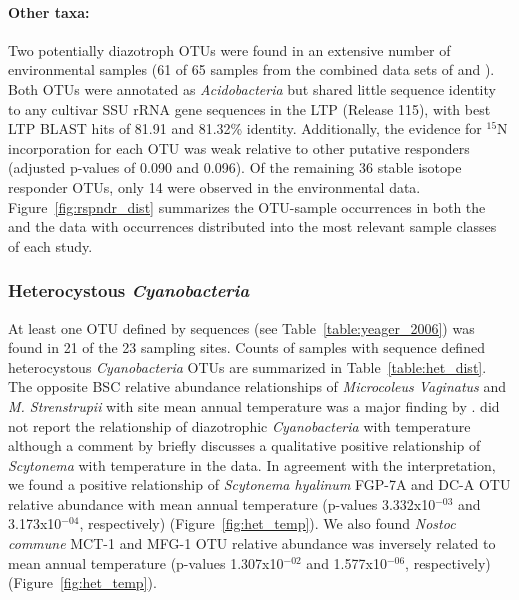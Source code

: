 \paragraph{\textbf{Other taxa:}} Two potentially diazotroph OTUs were found
in an extensive number of environmental samples (61 of 65 samples from the
combined data sets of \citet{Garcia_Pichel_2013} and \citet{Steven_2013}).
Both OTUs were annotated as \textit{Acidobacteria} but shared little sequence
identity to any cultivar SSU rRNA gene sequences in the LTP (Release 115),
with best LTP BLAST hits of 81.91 and 81.32\% identity. Additionally, the
evidence for $^{15}$N incorporation for each OTU was weak relative to other
putative responders (adjusted p-values of 0.090 and 0.096). Of the remaining
36 stable isotope responder OTUs, only 14 were observed in the environmental
data.  Figure~\ref{fig:rspndr_dist} summarizes the OTU-sample occurrences in
both the \citet{Steven_2013} and the \citet{Garcia_Pichel_2013} data with
occurrences distributed into the most relevant sample classes of each study.

\subsubsection{Heterocystous \textit{Cyanobacteria}} At least one OTU defined
by \citet{Yeager} sequences (see Table~\ref{table:yeager_2006}) was found in
21 of the 23 \citet{Garcia_Pichel_2013} sampling sites. Counts of samples
with \citet{Yeager} sequence defined heterocystous \textit{Cyanobacteria}
OTUs are summarized in Table~\ref{table:het_dist}. The opposite BSC relative
abundance relationships of \textit{Microcoleus Vaginatus} and \textit{M.
Strenstrupii} with site mean annual temperature was a major finding by
\citet{Garcia_Pichel_2013}.  \citet{Garcia_Pichel_2013} did not report the
relationship of diazotrophic \textit{Cyanobacteria} with temperature although
a comment by \citet{Belnap28062013} briefly discusses a qualitative positive
relationship of \textit{Scytonema} with temperature in the
\citet{Garcia_Pichel_2013} data.  In agreement with the
\citet{Belnap28062013} interpretation, we found a positive relationship of
\textit{Scytonema hyalinum} FGP-7A and DC-A OTU relative abundance with mean
annual temperature (p-values 3.332x10$^{-03}$ and 3.173x10$^{-04}$,
respectively) (Figure~\ref{fig:het_temp}). We also found \textit{Nostoc
commune} MCT-1 and MFG-1 OTU relative abundance was inversely related to mean
annual temperature (p-values 1.307x10$^{-02}$ and 1.577x10$^{-06}$,
respectively) (Figure~\ref{fig:het_temp}). 

